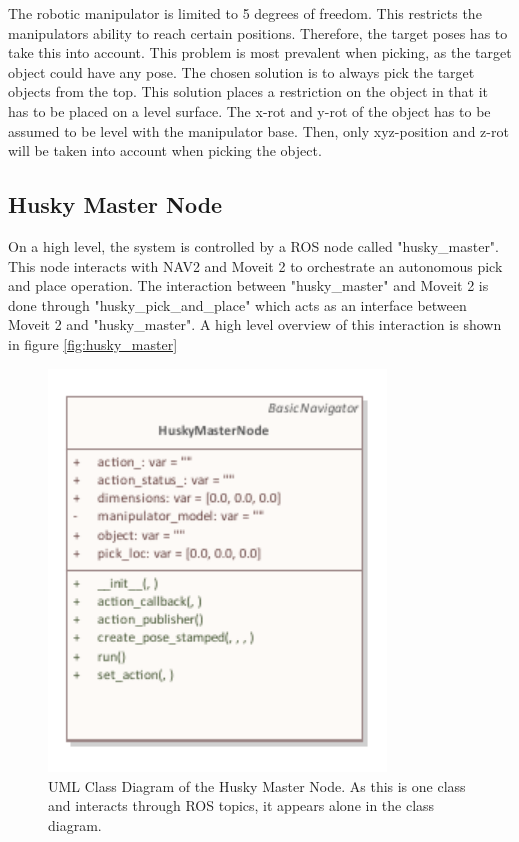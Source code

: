 The robotic manipulator is limited to 5 degrees of freedom. This restricts the manipulators ability to reach certain positions. Therefore, the target poses has to take this into account. This problem is most prevalent when picking, as the target object could have any pose.
The chosen solution is to always pick the target objects from the top. This solution places a restriction on the object in that it has to be placed on a level surface. The x-rot and y-rot of the object has to be assumed to be level with the manipulator base. Then, only xyz-position and z-rot  will be taken into account when picking the object.


\subsection{Husky Master Node} \label{sec:M:A:HuskyMasterNode}
On a high level, the system is controlled by a ROS node called "husky\_master". This node interacts with NAV2 and Moveit 2 to orchestrate an autonomous pick and place operation. The interaction between "husky\_master" and Moveit 2 is done through "husky\_pick\_and\_place" which acts as an interface between Moveit 2 and "husky\_master". A high level overview of this interaction is shown in figure \ref{fig:husky_master}

\begin{figure}[htp]
  \centering
  \includegraphics[width = 0.8\textwidth]{Figures/husky_master.pdf}
  \caption{UML Class Diagram of the Husky Master Node. As this is one class and interacts through ROS topics, it appears alone in the class diagram.}
  \label{fig:huskyMasterUML}
\end{figure}

